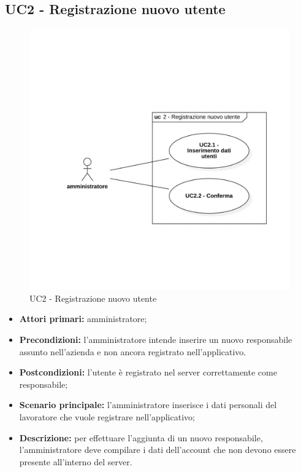 \subsection{UC2 - Registrazione nuovo utente}

\begin{figure}[H]
	\centering
	\includegraphics[scale=0.55]{res/images/uc2.png}
	\caption{UC2 - Registrazione nuovo utente}
\end{figure}
\begin{itemize}
	\item 	\textbf{Attori primari:} amministratore;
	\item 	\textbf{Precondizioni:}	l'amministratore intende inserire un nuovo responsabile assunto nell'azienda e non ancora registrato nell'applicativo.
	\item 	\textbf{Postcondizioni:} l'utente è registrato nel server correttamente come responsabile;
	\item 	\textbf{Scenario principale:} l'amministratore inserisce i dati personali del lavoratore che vuole registrare nell'applicativo;
	\item 	\textbf{Descrizione:} per effettuare l'aggiunta di un nuovo responsabile, l'amministratore deve compilare i dati dell'account che non devono essere presente all'interno del server.

\end{itemize}

